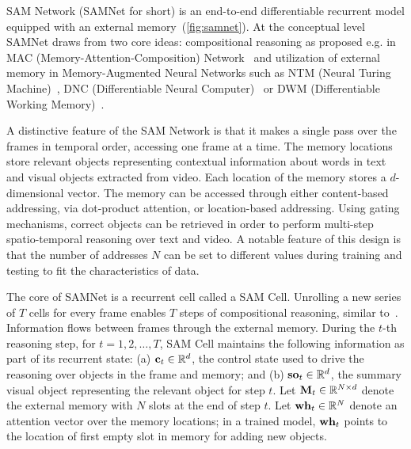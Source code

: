 SAM Network (SAMNet for short) is an end-to-end differentiable recurrent model equipped with an external memory~(\cref{fig:samnet}). At the conceptual level SAMNet draws from two core ideas:
compositional reasoning as proposed e.g. in MAC (Memory-Attention-Composition) Network~\cite{hudson2018compositional,marois2018transfer} and utilization of external memory in Memory-Augmented Neural Networks such as NTM (Neural Turing Machine)~\cite{graves2014neural}, DNC (Differentiable Neural Computer)~\cite{graves2016hybrid} or DWM (Differentiable Working Memory)~\cite{jayram2018learning}.

A distinctive feature of the SAM Network is that it makes a single pass over the frames in temporal order, accessing one frame at a time.
The memory locations store relevant objects representing contextual information about words in text and visual objects extracted from video. 
Each location of the memory stores a $d$-dimensional vector. %
The memory can be accessed through either content-based addressing, via dot-product attention, or location-based addressing. Using gating mechanisms, correct objects can be retrieved in order to perform multi-step spatio-temporal reasoning over text and video.
A notable feature of this design is that the number of addresses $N$ can be set to different values during training and testing to fit the characteristics of data.


The core of SAMNet is a recurrent cell called a SAM Cell. Unrolling a new series of $T$ cells for every frame enables $T$ steps of compositional reasoning, similar to~\cite{hudson2018compositional}. Information flows between frames through the external memory. 
During the $t$-th reasoning step, for $t=1,2, \dots, T$, SAM Cell maintains the following information as part of its recurrent state:
(a) $\mathbf{c}_t \in \mathbb{R}^d$, the control state used to drive the reasoning over objects in the frame and memory; and
(b) $\mathbf{so}_t  \in \mathbb{R}^d$, the summary visual object representing the relevant object for step $t$.
Let $\mathbf{M}_t \in  \mathbb{R}^{N \times d}$ denote the external memory with $N$ slots at the end of step $t$.
Let $\mathbf{wh}_t \in  \mathbb{R}^N$ denote an attention vector over the memory locations;
in a trained model, $\mathbf{wh}_t$ points to the location of first empty slot in memory for adding new objects.

